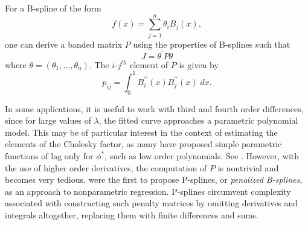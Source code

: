 \documentclass[12pt]{article}
\theoremstyle{definition}
\begin{document}
For a B-spline of the form
\[
f\left(x\right) = \sum\limits_{j=1}^n \theta_i B_j\left(x\right),
\]
one can derive a banded matrix $P$ using the properties of B-splines such that 
 \[
 J = \theta^\prime P \theta
 \] 
 \noindent
 where $\theta = \left(\theta_1,\dots, \theta_n\right)$. The $i$-$j^{th}$ element of $P$ is given by
 \[
 p_{ij} = \int_0^1 B_i^{\prime \prime} \left( x \right)B_j^{\prime \prime} \left( x \right)\;dx.
 \]


%
%

In some applications, it is useful to work with third and fourth order differences, since for large values of $\lambda$, the fitted curve approaches a parametric polynomial model. This may be of particular interest in the context of estimating the elements of the Cholesky factor, as many have proposed simple parametric functions of lag only for $\phi^*$, such as low order polynomials. See \citet{pourahmadi1999joint}. However, with the use of higher order derivatives, the computation of $P$ is nontrivial and becomes very tedious. \citet{eilers1996flexible} were the first to propose P-splines, or \emph{penalized B-splines}, as an approach to nonparametric regression. P-splines circumvent complexity associated with constructing such penalty matrices by omitting derivatives and integrals altogether, replacing them with finite differences and sums. 
\end{document}
